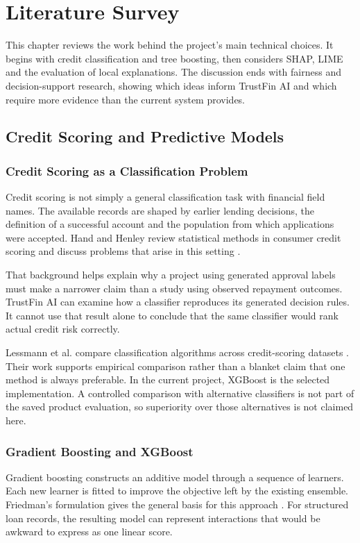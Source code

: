 \chapter[LITERATURE SURVEY]{Literature Survey}

This chapter reviews the work behind the project's main technical choices. It begins with credit classification and tree boosting, then considers SHAP, LIME and the evaluation of local explanations. The discussion ends with fairness and decision-support research, showing which ideas inform TrustFin AI and which require more evidence than the current system provides.

\section{Credit Scoring and Predictive Models}
\subsection{Credit Scoring as a Classification Problem}
Credit scoring is not simply a general classification task with financial field names. The available records are shaped by earlier lending decisions, the definition of a successful account and the population from which applications were accepted. Hand and Henley review statistical methods in consumer credit scoring and discuss problems that arise in this setting \cite{handHenley1997}.

That background helps explain why a project using generated approval labels must make a narrower claim than a study using observed repayment outcomes. TrustFin AI can examine how a classifier reproduces its generated decision rules. It cannot use that result alone to conclude that the same classifier would rank actual credit risk correctly.

Lessmann et al. compare classification algorithms across credit-scoring datasets \cite{lessmann2015}. Their work supports empirical comparison rather than a blanket claim that one method is always preferable. In the current project, XGBoost is the selected implementation. A controlled comparison with alternative classifiers is not part of the saved product evaluation, so superiority over those alternatives is not claimed here.

\subsection{Gradient Boosting and XGBoost}
Gradient boosting constructs an additive model through a sequence of learners. Each new learner is fitted to improve the objective left by the existing ensemble. Friedman's formulation gives the general basis for this approach \cite{friedman2001}. For structured loan records, the resulting model can represent interactions that would be awkward to express as one linear score.

